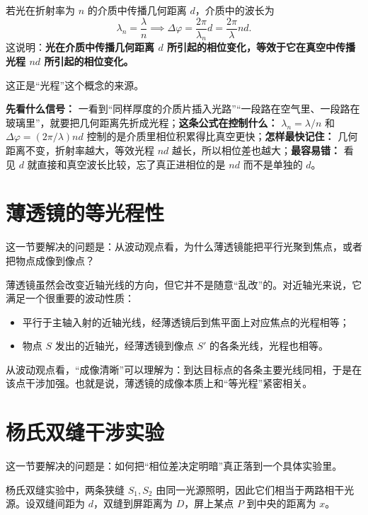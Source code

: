 \documentclass[lang=cn,11pt]{elegantbook}
\begin{document}
若光在折射率为 \(n\) 的介质中传播几何距离 \(d\)，介质中的波长为
\[
\lambda_n=\frac{\lambda}{n}
\implies
\Delta\varphi=\frac{2\pi}{\lambda_n}d=\frac{2\pi}{\lambda}nd.
\]
这说明：\textbf{光在介质中传播几何距离 \(d\) 所引起的相位变化，等效于它在真空中传播光程 \(nd\) 所引起的相位变化。}

这正是“光程”这个概念的来源。

\begin{note}
\textbf{先看什么信号：} 一看到“同样厚度的介质片插入光路”“一段路在空气里、一段路在玻璃里”，就要把几何距离先折成光程；\textbf{这条公式在控制什么：} \(\lambda_n=\lambda/n\) 和 \(\Delta\varphi=(2\pi/\lambda)nd\) 控制的是介质里相位积累得比真空更快；\textbf{怎样最快记住：} 几何距离不变，折射率越大，等效光程 \(nd\) 越长，所以相位差也越大；\textbf{最容易错：} 看见 \(d\) 就直接和真空波长比较，忘了真正进相位的是 \(nd\) 而不是单独的 \(d\)。
\end{note}

\section{薄透镜的等光程性}

这一节要解决的问题是：从波动观点看，为什么薄透镜能把平行光聚到焦点，或者把物点成像到像点？

薄透镜虽然会改变近轴光线的方向，但它并不是随意“乱改”的。对近轴光来说，它满足一个很重要的波动性质：
\begin{itemize}
  \item 平行于主轴入射的近轴光线，经薄透镜后到焦平面上对应焦点的光程相等；
  \item 物点 \(S\) 发出的近轴光，经薄透镜到像点 \(S'\) 的各条光线，光程也相等。
\end{itemize}

\begin{note}
从波动观点看，“成像清晰”可以理解为：到达目标点的各条主要光线同相，于是在该点干涉加强。也就是说，薄透镜的成像本质上和“等光程”紧密相关。
\end{note}

\section{杨氏双缝干涉实验}

这一节要解决的问题是：如何把“相位差决定明暗”真正落到一个具体实验里。

杨氏双缝实验中，两条狭缝 \(S_1,S_2\) 由同一光源照明，因此它们相当于两路相干光源。设双缝间距为 \(d\)，双缝到屏距离为 \(D\)，屏上某点 \(P\) 到中央的距离为 \(x\)。
\end{document}
